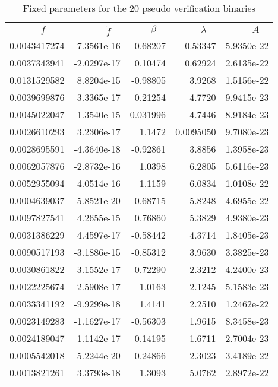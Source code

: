 \documentclass[11pt]{article}
\begin{document}
\begin{table}
\caption{Fixed parameters for the 20 pseudo verification binaries}
\begin{center}
\begin{tabular}{|r@{\hspace*{0.1in}}|r@{\hspace*{0.1in}}|r@{\hspace*{0.1in}}|r@{\hspace*{0.1in}}|r@{\hspace*{0.1in}}|}
\hline
\hspace*{0.1in} $f \quad \quad$ & $\dot f \quad$ & $\beta \quad$ & $\lambda \quad$ & $A \quad$ \\
\hline
0.0043417274 &	7.3561e-16  &	0.68207	  &	0.53347	  &	5.9350e-22  \\
0.0037343941 &	-2.0297e-17 &	0.10474	  &	0.62924	  &	2.6135e-22  \\
0.0131529582 &	8.8204e-15  &	-0.98805  &	3.9268	  &	1.5156e-22  \\
0.0039699876 &	-3.3365e-17 &	-0.21254  &	4.7720	  &	9.9415e-23   \\
0.0045022047 &	1.3540e-15  &	0.031996  &	4.7446	  &	8.9184e-23   \\
0.0026610293 &	3.2306e-17  &	1.1472	  &	0.0095050  &	9.7080e-23   \\
0.0028695591 &	-4.3640e-18 &	-0.92861  &	3.8856	  &	1.3958e-23   \\
0.0062057876 &	-2.8732e-16 &	1.0398	  &	6.2805	  &	5.6116e-23   \\
0.0052955094 &	4.0514e-16  &	1.1159	  &	6.0834	  &	1.0108e-22   \\
0.0004639037 &	5.8521e-20  &	0.68715	  &	5.8248	  &	4.6955e-22   \\
0.0097827541 &	4.2655e-15  &	0.76860	  &	5.3829	  &	4.9380e-23    \\
0.0031386229 &	4.4597e-17  &	-0.58442  &	4.3714	  &	1.8405e-23    \\
0.0090517193 &	-3.1886e-15  &	-0.85312  &	3.9630	  &	3.3825e-23    \\
0.0030861822 &	3.1552e-17  &	-0.72290  &	2.3212	  &	4.2400e-23    \\
0.0022225674 &	2.5908e-17  &	-1.0163	  &	2.1245	  &	5.1583e-23    \\
0.0033341192 &	-9.9299e-18 &	1.4141	  &	2.2510	  &	1.2462e-22    \\
0.0023149283 &	-1.1627e-17 &	-0.56303  &	1.9615	  &	8.3458e-23    \\
0.0024189047 &	1.1142e-17  &	-0.14195  &	1.6711	  &	2.7004e-23    \\
0.0005542018 &	5.2244e-20  &	0.24866	  &	2.3023	  &	3.4189e-22    \\
0.0013821261 &	3.3793e-18  &	1.3093	  &	5.0762	  &	2.8972e-22    \\
\hline
\end{tabular}
\end{center}
\end{table}
\end{document}
